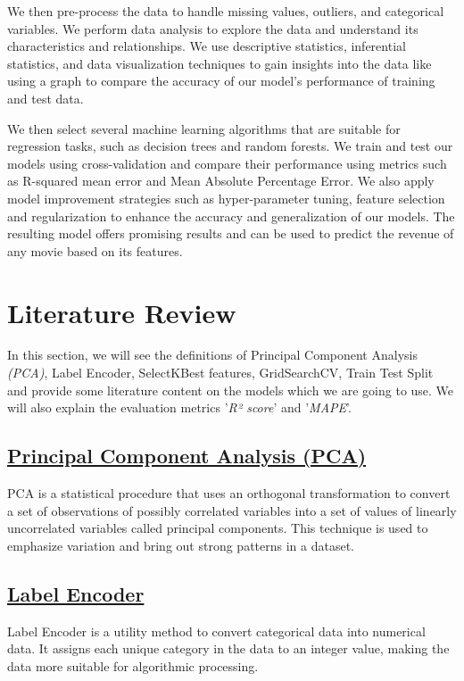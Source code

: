 \documentclass[conference]{IEEEtran}
\begin{document}
        We then pre-process the data to handle missing values, outliers, and categorical variables. We perform data analysis to explore the data and understand its characteristics and relationships. We use descriptive statistics, inferential statistics, and data visualization techniques to gain insights into the data like using a graph to compare the accuracy of our model's performance of training and test data.

        We then select several machine learning algorithms that are suitable for regression tasks, such as decision trees and random forests. We train and test our models using cross-validation and compare their performance using metrics such as R-squared mean error and Mean Absolute Percentage Error. We also apply model improvement strategies such as hyper-parameter tuning, feature selection and regularization to enhance the accuracy and generalization of our models. The resulting model offers promising results and can be used to predict the revenue of any movie based on its features.

\section{Literature Review}
    In this section, we will see the definitions of Principal Component Analysis \textit{(PCA)}, Label Encoder, SelectKBest features, GridSearchCV, Train Test Split and provide some literature content on the models which we are going to use. We will also explain the evaluation metrics '\textit{R² score}' and '\textit{MAPE}'.

    \subsection*{\href{https://en.wikipedia.org/wiki/Principal_component_analysis}{Principal Component Analysis (PCA)}}
    PCA is a statistical procedure that uses an orthogonal transformation to convert a set of observations of possibly correlated variables into a set of values of linearly uncorrelated variables called principal components. This technique is used to emphasize variation and bring out strong patterns in a dataset.

    \subsection*{\href{https://scikit-learn.org/stable/modules/generated/sklearn.preprocessing.LabelEncoder.html}{Label Encoder}}
    Label Encoder is a utility method to convert categorical data into numerical data. It assigns each unique category in the data to an integer value, making the data more suitable for algorithmic processing.
\end{document}
